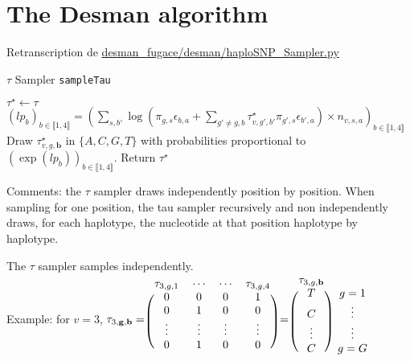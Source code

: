 \documentclass{article}
\newcommand{\code}[1]{\colorbox{light-gray}{\texttt{#1}}}
\newcommand\indexvec[1]{\mathbf{#1}}
\begin{document}
\section{The Desman algorithm}
Retranscription de \url{desman_fugace/desman/haploSNP_Sampler.py}
\begin{algorithm}[H]
\caption{$\tau$ Sampler \hfill{\code{sampleTau}}}\label{alg:desman_tau}
\begin{algorithmic}
\State $\tau^\star\gets\tau$
    \State   $(lp_b)_{b\in\llbracket 1,4\rrbracket}=  \left(\sum_{s,b'}      \log\left(\pi_{g,s}\epsilon_{b,a}+\sum_{g'\neq g,b}\tau^\star_{v,g',b'}\pi_{g',s}\epsilon_{b',a}\right)\times n_{v,s,a}\right)_{b\in\llbracket 1,4\rrbracket}$
    \State Draw $\tau^\star_{v,g,\indexvec{b}}$ in $\{A,C,G,T\}$ with probabilities proportional to $(\exp(lp_b))_{b\in\llbracket 1,4\rrbracket}$.
 \EndFor
 \EndFor
\State Return $\tau^\star$
\EndProcedure
\end{algorithmic}
\end{algorithm}
Comments: the $\tau$ sampler draws independently position by position.
When sampling for one position, the tau sampler recursively and non independently draws, for each haplotype, the nucleotide at that position haplotype by haplotype.

The $\tau$ sampler samples independently.\\
Example: for $v=3$, $\tau_{3,\indexvec{g},\indexvec{b}}=\begin{blockarray}{cccc}
\tau_{3,g,1}&\cdots&\cdots&\tau_{3,g,4}\\
    \begin{block}{(cccc)}
    0&0&0&1\\
    0&1&0&0\\
    \vdots&\vdots&\vdots&\vdots\\
    0&1&0&0\\
    \end{block}\end{blockarray}=
    \begin{blockarray}{cc}
    \tau_{3,g,\indexvec{b}}&\\
    \begin{block}{(c)c}
    T&g=1\\
    C&\vdots\\
    \vdots&\vdots\\
    C&g=G\\
    \end{block}\end{blockarray}$
\end{document}
